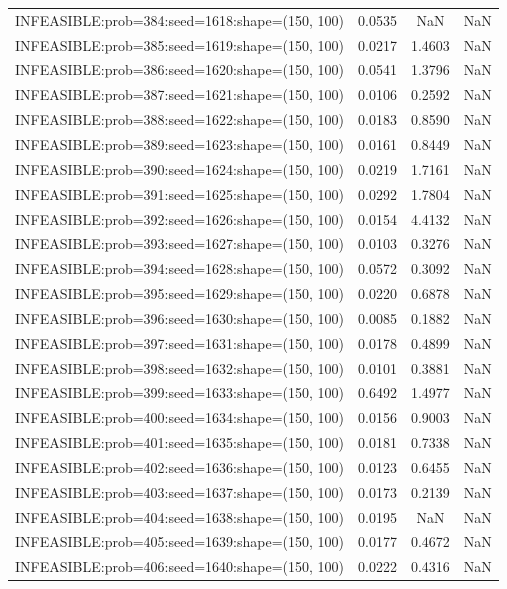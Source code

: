 \begin{longtable}{lccc}
INFEASIBLE:prob=384:seed=1618:shape=(150, 100) & 0.0535 &     NaN &    NaN \\
INFEASIBLE:prob=385:seed=1619:shape=(150, 100) & 0.0217 &  1.4603 &    NaN \\
INFEASIBLE:prob=386:seed=1620:shape=(150, 100) & 0.0541 &  1.3796 &    NaN \\
INFEASIBLE:prob=387:seed=1621:shape=(150, 100) & 0.0106 &  0.2592 &    NaN \\
INFEASIBLE:prob=388:seed=1622:shape=(150, 100) & 0.0183 &  0.8590 &    NaN \\
INFEASIBLE:prob=389:seed=1623:shape=(150, 100) & 0.0161 &  0.8449 &    NaN \\
INFEASIBLE:prob=390:seed=1624:shape=(150, 100) & 0.0219 &  1.7161 &    NaN \\
INFEASIBLE:prob=391:seed=1625:shape=(150, 100) & 0.0292 &  1.7804 &    NaN \\
INFEASIBLE:prob=392:seed=1626:shape=(150, 100) & 0.0154 &  4.4132 &    NaN \\
INFEASIBLE:prob=393:seed=1627:shape=(150, 100) & 0.0103 &  0.3276 &    NaN \\
INFEASIBLE:prob=394:seed=1628:shape=(150, 100) & 0.0572 &  0.3092 &    NaN \\
INFEASIBLE:prob=395:seed=1629:shape=(150, 100) & 0.0220 &  0.6878 &    NaN \\
INFEASIBLE:prob=396:seed=1630:shape=(150, 100) & 0.0085 &  0.1882 &    NaN \\
INFEASIBLE:prob=397:seed=1631:shape=(150, 100) & 0.0178 &  0.4899 &    NaN \\
INFEASIBLE:prob=398:seed=1632:shape=(150, 100) & 0.0101 &  0.3881 &    NaN \\
INFEASIBLE:prob=399:seed=1633:shape=(150, 100) & 0.6492 &  1.4977 &    NaN \\
INFEASIBLE:prob=400:seed=1634:shape=(150, 100) & 0.0156 &  0.9003 &    NaN \\
INFEASIBLE:prob=401:seed=1635:shape=(150, 100) & 0.0181 &  0.7338 &    NaN \\
INFEASIBLE:prob=402:seed=1636:shape=(150, 100) & 0.0123 &  0.6455 &    NaN \\
INFEASIBLE:prob=403:seed=1637:shape=(150, 100) & 0.0173 &  0.2139 &    NaN \\
INFEASIBLE:prob=404:seed=1638:shape=(150, 100) & 0.0195 &     NaN &    NaN \\
INFEASIBLE:prob=405:seed=1639:shape=(150, 100) & 0.0177 &  0.4672 &    NaN \\
INFEASIBLE:prob=406:seed=1640:shape=(150, 100) & 0.0222 &  0.4316 &    NaN \\

\end{longtable}
